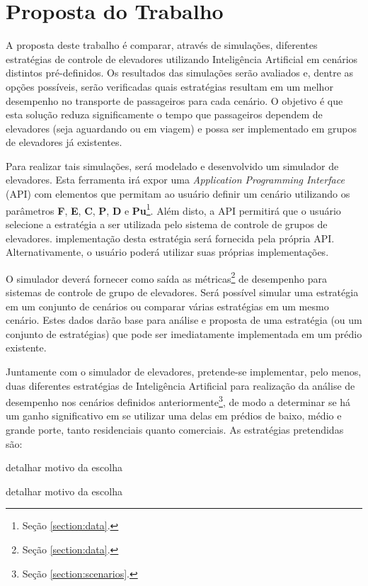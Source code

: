 \chapter{\label{chap:proposal}Proposta do Trabalho}

A proposta deste trabalho é comparar, através de simulações, diferentes
estratégias de controle de elevadores utilizando Inteligência Artificial em
cenários distintos pré-definidos. Os resultados das simulações serão avaliados
e, dentre as opções possíveis, serão verificadas quais estratégias resultam em
um melhor desempenho no transporte de passageiros para cada cenário. O objetivo
é que esta solução reduza significamente o tempo que passageiros dependem de
elevadores (seja aguardando ou em viagem) e possa ser implementado em grupos de
elevadores já existentes.

Para realizar tais simulações, será modelado e desenvolvido um simulador de
elevadores. Esta ferramenta irá expor uma \textit{Application Programming
Interface} (API) com elementos que permitam ao usuário definir um cenário
utilizando os parâmetros \textbf{F}, \textbf{E}, \textbf{C}, \textbf{P},
\textbf{D} e \textbf{Pu}\footnote{Seção \ref{section:data}.}. Além disto, a API
permitirá que o usuário selecione a estratégia a ser utilizada pelo sistema de
controle de grupos de elevadores. implementação desta estratégia será fornecida
pela própria API. Alternativamente, o usuário poderá utilizar suas próprias
implementações.

O simulador deverá fornecer como saída as métricas\footnote{Seção
\ref{section:data}.} de desempenho para sistemas de controle de grupo de
elevadores. Será possível simular uma estratégia em um conjunto de cenários ou
comparar várias estratégias em um mesmo cenário. Estes dados darão base para
análise e proposta de uma estratégia (ou um conjunto de estratégias) que pode
ser imediatamente implementada em um prédio existente.

Juntamente com o simulador de elevadores, pretende-se implementar, pelo menos,
duas diferentes estratégias de Inteligência Artificial para realização da
análise de desempenho nos cenários definidos anteriormente\footnote{Seção
\ref{section:scenarios}.}, de modo a determinar se há um ganho significativo em
se utilizar uma delas em prédios de baixo, médio e grande porte, tanto
residenciais quanto comerciais. As estratégias pretendidas são:

\begin{description}[leftmargin=!,labelwidth=\widthof{\bfseries Aprendizado de máquina}]
  \item[Sistemas multi-agentes] {\color{red} detalhar motivo da escolha}
  \item[Aprendizado de máquina] {\color{red} detalhar motivo da escolha}
\end{description}
